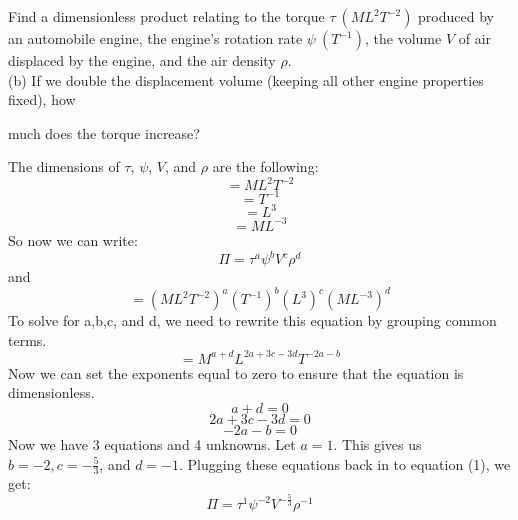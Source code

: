 \documentclass[11pt,answers]{exam}
\begin{document}
\begin{questions}

\addtocounter{question}{29}
\item Find a dimensionless product relating to the torque $\tau \: (ML^2T^{-2})$ produced by an automobile engine, the engine's rotation rate $\psi \: (T^{-1})$, the volume $V$ of air displaced by the engine, and the air density $\rho$.\\
(b) If we double the displacement volume (keeping all other engine properties fixed), how

much does the torque increase?
\begin{solution}
The dimensions of $\tau$, $\psi$, $V$, and $\rho$ are the following: 
\begin{equation*}
[\tau] = ML^2T^{-2}
\end{equation*}
\begin{equation*}
[\psi] = T^{-1} 
\end{equation*}
\begin{equation*}
[V]= L^3 
\end{equation*}
\begin{equation*}
[\rho] = ML^{-3} 
\end{equation*}
So now we can write: 
\begin{equation*}
\Pi = \tau ^a \psi^b V^c \rho^d
\end{equation*}
and 
\begin{equation*}
[\Pi] = (ML^2T^{-2})^a (T^{-1})^b (L^3)^c (ML^{-3})^d
\end{equation*}
To solve for a,b,c, and d, we need to rewrite this equation by grouping common terms.
\begin{equation*}
[\Pi] = M^{a+d}L^{2a + 3c-3d}T^{-2a-b}
\end{equation*}
Now we can set the exponents equal to zero to ensure that the equation is dimensionless.
\begin{equation*}
a+d = 0 
\end{equation*}
\begin{equation*}
2a + 3c - 3d = 0 
\end{equation*}
\begin{equation*}
-2a-b = 0
\end{equation*}
Now we have 3 equations and 4 unknowns. Let $a = 1$. This gives us $b = -2, c = -\frac{5}{3}$, and $d = -1 $. Plugging these equations back in to equation (1), we get:
\begin{equation*}
\Pi = \tau ^1 \psi^{-2} V^{-\frac{5}{3}} \rho^{-1}
\end{equation*}

\end{solution}
\end{questions}
\end{document}
